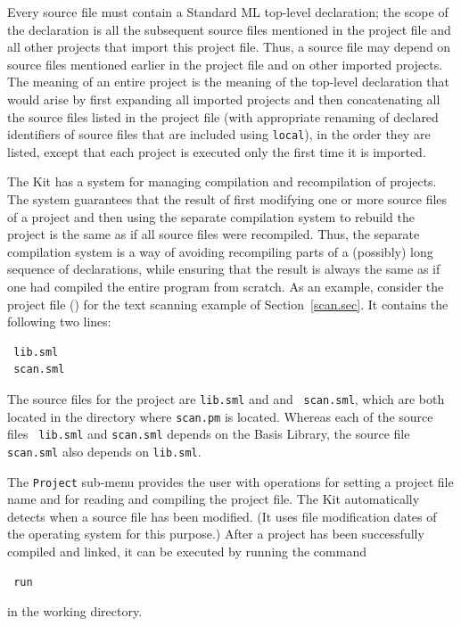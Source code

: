 \documentclass[12pt]{book}
\begin{document}
Every source file must contain a Standard ML top-level declaration;
the scope of the declaration is all the subsequent source files
mentioned in the project file and all other projects that import this
project file. Thus, a source file may depend on source files mentioned
earlier in the project file and on other imported projects.  The
meaning of an entire project is the meaning of the top-level
declaration that would arise by first expanding all imported projects
and then concatenating all the source files listed in the project file
(with appropriate renaming of declared identifiers of source files that are
included using {\tt local}), in the order they are listed, except that
each project is executed only the first time it is imported.

The Kit has a system for managing compilation and recompilation of
projects.  The system guarantees that the result of first modifying
one or more source files of a project and then using the separate
compilation system to rebuild the project is the same as if all source
files were
recompiled.
%
Thus, the separate compilation system is a way of avoiding recompiling
parts of a (possibly) long sequence of declarations, while ensuring
that the result is always the same as if one had compiled the entire
program from scratch.  As an example, consider the project file () for the text
scanning example of Section~\ref{scan.sec}. It contains the following two lines:
\begin{verbatim}
 lib.sml
 scan.sml
\end{verbatim}

\noindent 
The source files for the project are {\tt lib.sml} and and {\tt
  scan.sml}, which are both located in the directory where 
{\tt scan.pm} is located. Whereas each of the source files {\tt
  lib.sml} and {\tt scan.sml} depends on the Basis Library, the source
file {\tt scan.sml} also depends on {\tt lib.sml}.

The {\tt Project} sub-menu provides the user with operations for
setting a project file name and for reading and compiling the project
file.  The Kit automatically detects when a source file has been
modified. (It uses file modification dates of the operating system for
this purpose.)  After a project has been successfully compiled and
linked, it can be executed by running the command
\begin{verbatim}
 run
\end{verbatim}
in the working directory.  
\end{document}
